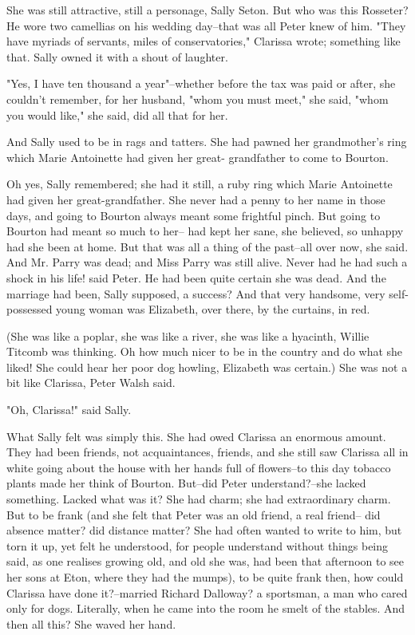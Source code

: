 \documentclass[lang=cn,10pt]{elegantbook}
\begin{document}
She was still attractive, still a personage, Sally Seton.  But who
was this Rosseter?  He wore two camellias on his wedding day--that
was all Peter knew of him.  "They have myriads of servants, miles
of conservatories," Clarissa wrote; something like that.  Sally
owned it with a shout of laughter.

"Yes, I have ten thousand a year"--whether before the tax was paid
or after, she couldn't remember, for her husband, "whom you must
meet," she said, "whom you would like," she said, did all that for
her.

And Sally used to be in rags and tatters.  She had pawned her
grandmother's ring which Marie Antoinette had given her great-
grandfather to come to Bourton.

Oh yes, Sally remembered; she had it still, a ruby ring which Marie
Antoinette had given her great-grandfather.  She never had a penny
to her name in those days, and going to Bourton always meant some
frightful pinch.  But going to Bourton had meant so much to her--
had kept her sane, she believed, so unhappy had she been at home.
But that was all a thing of the past--all over now, she said.  And
Mr. Parry was dead; and Miss Parry was still alive.  Never had he
had such a shock in his life! said Peter.  He had been quite
certain she was dead.  And the marriage had been, Sally supposed, a
success?  And that very handsome, very self-possessed young woman
was Elizabeth, over there, by the curtains, in red.

(She was like a poplar, she was like a river, she was like a
hyacinth, Willie Titcomb was thinking.  Oh how much nicer to be in
the country and do what she liked!  She could hear her poor dog
howling, Elizabeth was certain.)  She was not a bit like Clarissa,
Peter Walsh said.

"Oh, Clarissa!" said Sally.

What Sally felt was simply this.  She had owed Clarissa an enormous
amount.  They had been friends, not acquaintances, friends, and she
still saw Clarissa all in white going about the house with her
hands full of flowers--to this day tobacco plants made her think of
Bourton.  But--did Peter understand?--she lacked something.  Lacked
what was it?  She had charm; she had extraordinary charm.  But to
be frank (and she felt that Peter was an old friend, a real friend--
did absence matter? did distance matter?  She had often wanted to
write to him, but torn it up, yet felt he understood, for people
understand without things being said, as one realises growing old,
and old she was, had been that afternoon to see her sons at Eton,
where they had the mumps), to be quite frank then, how could
Clarissa have done it?--married Richard Dalloway? a sportsman, a
man who cared only for dogs.  Literally, when he came into the room
he smelt of the stables.  And then all this?  She waved her hand.
\end{document}
